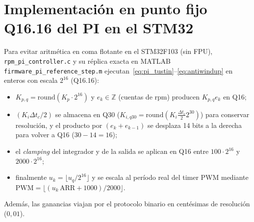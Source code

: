 \documentclass[11pt,a4paper,oneside]{report}
\theoremstyle{definition}
\theoremstyle{remark}
\begin{document}
\section{Implementación en punto fijo Q16.16 del PI en el STM32}\label{ap:q16}
Para evitar aritmética en coma flotante en el STM32F103 (sin FPU),
\texttt{rpm\_pi\_controller.c} y su réplica exacta en MATLAB
\texttt{firmware\_pi\_reference\_step.m} ejecutan~\eqref{eq:pi_tustin}--\eqref{eq:antiwindup}
en enteros con escala $2^{16}$ (Q16.16):
\begin{itemize}
  \item $K_{p,q} = \mathrm{round}(K_p\cdot 2^{16})$ y $e_k\in\mathbb Z$
        (cuentas de rpm) producen $K_{p,q}e_k$ en Q16;
  \item $(K_i\Delta t_c/2)$ se almacena en Q30 ($K_{i,q30}=\mathrm{round}(K_i\frac{\Delta t_c}{2}2^{30})$)
        para conservar resolución, y el producto por $(e_k+e_{k-1})$ se desplaza
        14 bits a la derecha para volver a Q16 ($30-14=16$);
  \item el \emph{clamping} del integrador y de la salida se aplican en Q16 entre
        $100\cdot 2^{16}$ y $2000\cdot 2^{16}$;
  \item finalmente $u_k = \lfloor u_q/2^{16}\rfloor$ y se escala al período real
        del timer PWM mediante $\mathrm{PWM}=\lfloor(u_k\,\mathrm{ARR}+1000)/2000\rfloor$.
\end{itemize}
Además, las ganancias viajan por el protocolo binario en centésimas de
resolución ($0{,}01$).
\end{document}
